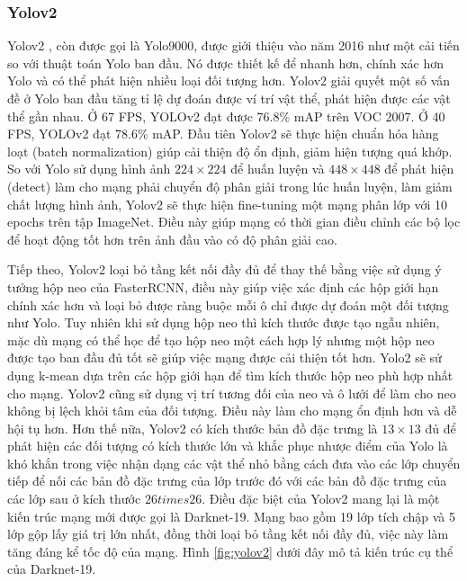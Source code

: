 \documentclass[../the.tex]{subfiles}
\begin{document}
\subsubsection{Yolov2}
{\fontsize{13}{12} \selectfont  

Yolov2 \cite{redmon2016yolo9000}, còn được gọi là Yolo9000, được giới thiệu vào năm 2016 như một cải tiến so với thuật toán Yolo ban đầu. Nó được thiết kế để nhanh hơn, chính xác hơn Yolo và có thể phát hiện nhiều loại đối tượng hơn.
Yolov2 giải quyết một số vấn đề ở Yolo ban đầu tăng tỉ lệ dự đoán được ví trí vật thể, phát hiện được các vật thể gần nhau. 
Ở 67 FPS, YOLOv2 đạt được 76.8\% mAP trên VOC 2007. Ở 40 FPS, YOLOv2 đạt 78.6\% mAP.
Đầu tiên Yolov2 sẽ thực hiện chuẩn hóa hàng loạt (batch normalization) giúp cải thiện độ ổn định, giảm hiện tượng quá khớp. So với Yolo sử dụng hình ảnh $224 \times 224$ để huấn luyện và $448 \times 448$
để phát hiện (detect)  làm cho mạng phải chuyển độ phân giải trong lúc huấn luyện, làm giảm chất lượng hình ảnh, Yolov2 sẽ thực hiện fine-tuning một mạng phân lớp với 10 epochs trên tập ImageNet.
Điều này giúp mạng có thời gian điều chỉnh các bộ lọc để hoạt động tốt hơn trên ảnh đầu vào có độ phân giải cao. 

Tiếp theo, Yolov2 loại bỏ tầng kết nối đầy đủ để thay thế bằng việc sử dụng ý tưởng hộp neo của FasterRCNN,
điều này giúp việc xác định các hộp giới hạn chính xác hơn và loại bỏ được ràng buộc mỗi ô chỉ được dự đoán một đối tượng như Yolo. 
Tuy nhiên khi sử dụng hộp neo thì kích thước được tạo ngẫu nhiên, mặc dù mạng có thể học để tạo hộp neo một cách hợp lý nhưng một hộp neo được tạo
ban đầu đủ tốt sẽ giúp việc mạng được cải thiện tốt hơn. Yolo2 sẽ sử dụng k-mean dựa trên các hộp giới hạn để tìm kích thước hộp neo phù hợp nhất cho mạng.
Yolov2 cũng sử dụng vị trí tương
đối của neo và ô lưới để làm cho neo không bị lệch khỏi tâm của đối tượng. Điều này
làm cho mạng ổn định hơn và dễ hội tụ hơn. Hơn thế nữa, Yolov2 có kích thước bản đồ đặc trưng là $13 \times 13$ đủ để phát hiện các đối tượng có kích thước lớn và khắc phục nhược điểm của Yolo là khó khắn trong việc nhận dạng các vật thể nhỏ
bằng cách đưa vào các lớp chuyển tiếp để nối các bản đồ đặc trưng của lớp trước đó với các bản đồ đặc trưng của các lớp sau ở kích thước $26 
times 26$. Điều đặc biệt của Yolov2 mang lại là một kiến trúc mạng mới được gọi là Darknet-19. 
Mạng bao gồm 19 lớp tích chập và 5 lớp gộp lấy giá trị lớn nhất, đồng thời loại bỏ tầng kết nối đầy đủ, việc này làm tăng đáng kể tốc độ của mạng.
Hình \ref{fig:yolov2} dưới đây mô tả kiến trúc cụ thể của Darknet-19. 

}
\end{document}
